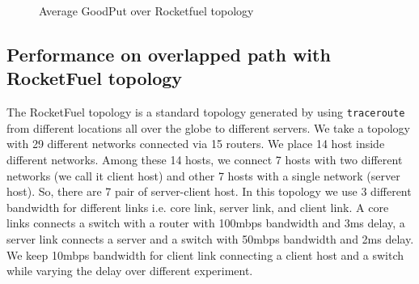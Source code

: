 \begin{figure}[h]
	\captionsetup[subfigure]{}
	\begin{center}
		\caption{\label{fig:rocketfuel_goodput}Average GoodPut over Rocketfuel topology}
	\end{center}
\end{figure}

\subsection{Performance on overlapped path with RocketFuel topology}
The RocketFuel topology is a standard topology generated by using {\tt traceroute} from different locations all over the globe to different servers. We take a topology with 29 different networks connected via 15 routers. We place 14 host inside different networks. Among these 14 hosts, we connect 7 hosts with two different networks (we call it client host) and other 7 hosts with a single network (server host). So, there are 7 pair of server-client host. In this topology we use 3 different bandwidth for different links i.e. core link, server link, and client link. A core links connects a switch with a router with 100mbps bandwidth and 3ms delay, a server link connects a server and a switch with 50mbps bandwidth and 2ms delay. We keep 10mbps bandwidth for client link connecting a client host and a switch while varying the delay over different experiment.

